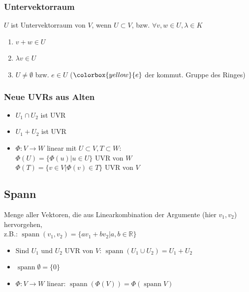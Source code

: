 \documentclass[german, fourcolumn, 8pt]{latex4ei/latex4ei_sheet}
\DeclareMathOperator{\spann}{spann}
\begin{document}
\begin{sectionbox}
    \subsubsection{Untervektorraum}
    $U$ ist Untervektorraum von $V$, wenn $U \subset V$, bzw. $\forall v,w \in U, \lambda \in K$
    \begin{enumerate}
        \item $v+w \in U$
        \item $\lambda v \in U$
        \item $U \neq \emptyset$ bzw. $e \in U$ ($\colorbox{yellow}{e}$ der kommut. Gruppe des Ringes)
    \end{enumerate}

    \subsubsection{Neue UVRs aus Alten}
    \begin{itemize}
        \item $U_1 \cap U_2$ ist UVR
        \item $U_1 + U_2$ ist UVR
        \item $\Phi : V \rightarrow W$ linear mit $U \subset V, T \subset W$: \\
              $\Phi(U)=\{\Phi(u) | u \in U\}$ UVR von $W$\\
              $\Phi(T)=\{v \in V | \Phi(v) \in T\}$ UVR von $V$
    \end{itemize}
\end{sectionbox}

\begin{sectionbox}
    \subsection{Spann}
    Menge aller Vektoren, die aus Linearkombination der Argumente (hier $v_1, v_2$) hervorgehen,\\
    z.B.: $\spann(v_1, v_2)=\{av_1 + bv_2 | a,b \in \mathbb{R}\}$
    \begin{itemize}
        \item Sind $U_1$ und $U_2$ UVR von $V$: $\spann(U_1 \cup U_2) = U_1 + U_2$
        \item $\spann \emptyset = \{0\}$
        \item $\Phi : V \rightarrow W$ linear: $\spann(\Phi(V))=\Phi(\spann V)$
    \end{itemize}
\end{sectionbox}
\end{document}
